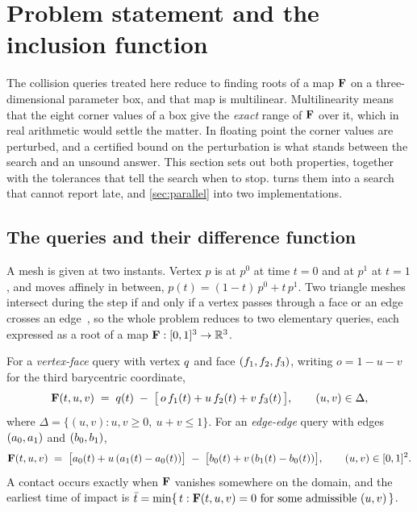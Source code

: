 \section{Problem statement and the inclusion function}
\label{sec:prelim}

The collision queries treated here reduce to finding roots of a map $\mathbf{F}$ on
a three-dimensional parameter box, and that map is multilinear. Multilinearity
means that the eight corner values of a box give the \emph{exact} range of
$\mathbf{F}$ over it, which in real arithmetic would settle the matter. In floating
point the corner values are perturbed, and a certified bound on the perturbation
is what stands between the search and an unsound answer. This section sets out
both properties, together with the tolerances that tell the search when to stop.
 turns them into a search that cannot report late, and
\cref{sec:parallel} into two implementations.

\subsection{The queries and their difference function}
\label{sec:prelim:queries}

A mesh is given at two instants. Vertex $p$ is at $p^{0}$ at time $t=0$ and at
$p^{1}$ at $t=1$, and moves affinely in between, $p(t) = (1-t)\,p^{0} +
t\,p^{1}$. Two triangle meshes intersect during the step if and only if a vertex
passes through a face or an edge crosses an edge~\citep{provot1997collision}, so
the whole problem reduces to two elementary queries, each expressed as a root of
a map $\mathbf{F} : [0,1]^{3} \to \mathbb{R}^{3}$.

For a \emph{vertex-face} query with vertex $q$ and face
$(f_{1},f_{2},f_{3})$, writing $o = 1-u-v$ for the third
barycentric coordinate,
\begin{equation}
\label{eq:fvf}
\mathbf{F}(t,u,v) \;=\; q(t) \;-\; \bigl[\,o\,f_{1}(t) + u\,f_{2}(t)
+ v\,f_{3}(t)\,\bigr], \qquad (u,v)\in\Delta,
\end{equation}
where $\Delta = \{(u,v) : u,v \ge 0,\ u+v \le 1\}$. For an \emph{edge-edge}
query with edges $(a_{0},a_{1})$ and
$(b_{0},b_{1})$,
\begin{equation}
\label{eq:fee}
\mathbf{F}(t,u,v) \;=\; \bigl[a_{0}(t) + u\,(a_{1}(t)-a_{0}(t))\bigr] \;-\;
\bigl[b_{0}(t) + v\,(b_{1}(t)-b_{0}(t))\bigr], \qquad (u,v)\in[0,1]^{2}.
\end{equation}
A contact occurs exactly when $\mathbf{F}$ vanishes somewhere on the domain, and the
earliest time of impact is $\bar{t} = \min\{\,t : \mathbf{F}(t,u,v)=0 \text{ for
some admissible } (u,v)\,\}$.

